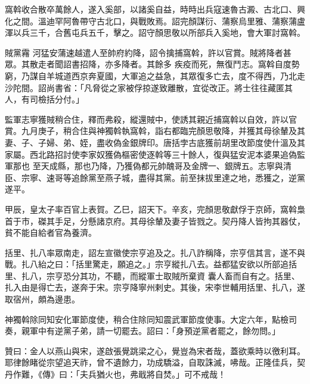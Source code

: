 \begin{pinyinscope}
 窩斡收合散卒萬餘人，遂入奚部，以諸奚自益，時時出兵寇速魯古澱、古北口、興化之間。溫迪罕阿魯帶守古北口，與戰敗焉。詔完顏謀衍、蒲察烏里雅、蒲察蒲盧渾以兵三千，合舊屯兵五千，擊之。詔守顏思敬以所部兵入奚地，會大軍討窩斡。


賊黨霿
 河猛安蒲速越遣人至帥府約降，詔令擒捕窩斡，許以官賞。賊將降者甚眾。其散走者聞詔書招降，亦多降者。其餘多
 疾疫而死，無復鬥志。窩斡自度勢窮，乃謀自羊城道西京奔夏國，大軍追之益急，其眾復多亡去，度不得西，乃北走沙陀間。詔尚書省：「凡脅從之家被俘掠遂致離散，宜從改正。將士往往藏匿其人，有司檢括分付。」



 監軍志寧獲賊稍合住，釋而弗殺，縱還賊中，使誘其親近捕窩斡以自效，許以官賞。九月庚子，稍合住與神獨斡執窩斡，詣右都臨完顏思敬降，并獲其母徐輦及其妻、子、子婦、弟、姪，盡收偽金銀牌印。唐括孛古底獲前胡里改節度使什溫及其家屬。西北路招討使李家奴獲偽樞密使逐斡等三十餘人，復與猛安泥本婆果追偽監軍那也
 至天成縣，那也乃降，乃獲偽都元帥醜哥及金牌一、銀牌五。志寧與清臣、宗寧、速哥等追餘黨至燕子城，盡得其黨。前至抹拔里達之地，悉獲之，逆黨遂平。



 甲辰，皇太子率百官上表賀。乙巳，詔天下。辛亥，完顏思敬獻俘于京師，窩斡梟首于市，磔其手足，分懸諸京府。其母徐輦及妻子皆戮之。契丹降人皆拘其器仗，貧不能自給者官為養濟。



 括里、扎八率眾南走，詔左宣徽使宗亨追及之。扎八詐稱降，宗亨信其言，遂不與戰。扎八紿之曰：「括里驚走，願追之。」宗亨縱扎八去。益都猛安欲以所部追括里、扎八，宗亨恐分其功，不聽，而縱軍士取賊所棄資
 囊人畜而自有之。括里、扎入由是得亡去，遂奔于宋。宗亨降寧州剌史。其後，宋李世輔用括里、扎八，遂取宿州，頗為邊患。



 神獨斡除同知安化軍節度使，稍合住除同知震武軍節度使事。大定六年，點檢司奏，親軍中有逆黨子弟，請一切罷去。詔曰：「身預逆黨者罷之，餘勿問。」



 贊曰：金人以燕山與宋，遂啟張覺跳梁之心，覺豈為宋者哉，蓋欲乘時以徼利耳。耶律餘睹從宗望追天祚，曾不遺餘力，功成驕溢，自取誅滅，咈哉。正隆佳兵，契丹作難，《傳》曰：「夫兵猶火也，弗戢將自焚。」可不戒哉！



\end{pinyinscope}